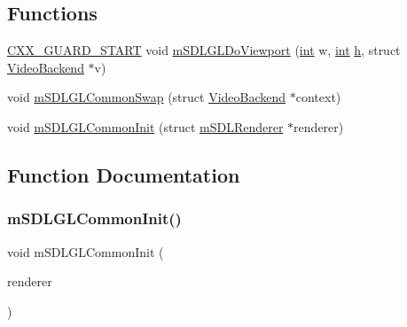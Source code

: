 \subsection*{Functions}
\begin{DoxyCompactItemize}
\item 
\mbox{\hyperlink{__builder_8h_af721f4bd9a2c3267a89d3967b3ca1747}{C\+X\+X\+\_\+\+G\+U\+A\+R\+D\+\_\+\+S\+T\+A\+RT}} void \mbox{\hyperlink{gl-common_8h_a85812103de7937a9b1affd22665bd01c}{m\+S\+D\+L\+G\+L\+Do\+Viewport}} (\mbox{\hyperlink{ioapi_8h_a787fa3cf048117ba7123753c1e74fcd6}{int}} w, \mbox{\hyperlink{ioapi_8h_a787fa3cf048117ba7123753c1e74fcd6}{int}} \mbox{\hyperlink{isa-lr35902_8c_a06a62682361411df32cf88f75a0b8da4}{h}}, struct \mbox{\hyperlink{struct_video_backend}{Video\+Backend}} $\ast$v)
\item 
void \mbox{\hyperlink{gl-common_8h_ae4d176ceb2ea06fadb56334f1022586e}{m\+S\+D\+L\+G\+L\+Common\+Swap}} (struct \mbox{\hyperlink{struct_video_backend}{Video\+Backend}} $\ast$context)
\item 
void \mbox{\hyperlink{gl-common_8h_a0e50f5587724b819f700b4e7efcec813}{m\+S\+D\+L\+G\+L\+Common\+Init}} (struct \mbox{\hyperlink{structm_s_d_l_renderer}{m\+S\+D\+L\+Renderer}} $\ast$renderer)
\end{DoxyCompactItemize}


\subsection{Function Documentation}
\mbox{\label{gl-common_8h_a0e50f5587724b819f700b4e7efcec813}} 
\subsubsection{\texorpdfstring{m\+S\+D\+L\+G\+L\+Common\+Init()}{mSDLGLCommonInit()}}
{\footnotesize\ttfamily void m\+S\+D\+L\+G\+L\+Common\+Init (\begin{DoxyParamCaption}\item[{struct \mbox{\hyperlink{structm_s_d_l_renderer}{m\+S\+D\+L\+Renderer}} $\ast$}]{renderer }\end{DoxyParamCaption})}


